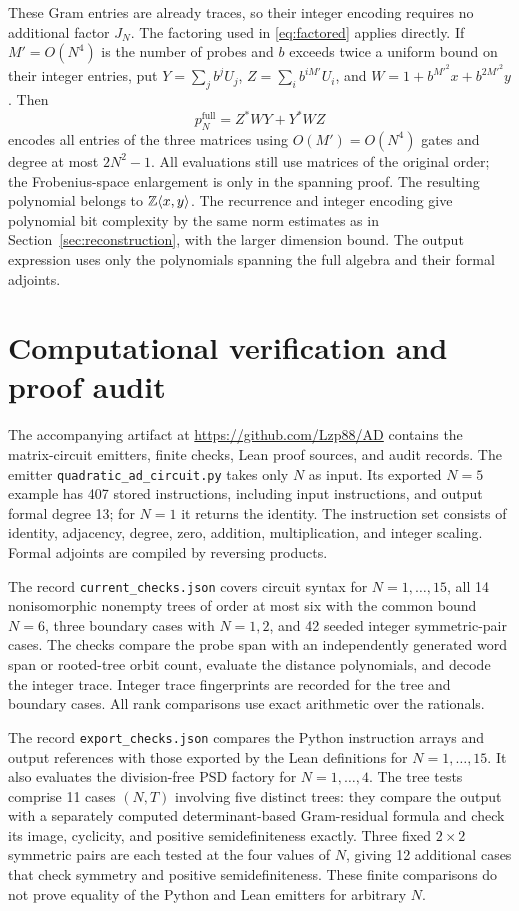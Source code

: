 \documentclass[11pt,letterpaper]{article}
\theoremstyle{definition}\newtheorem{definition}[theorem]{Definition}
\theoremstyle{remark}\newtheorem{remark}[theorem]{Remark}
\begin{document}
These Gram entries are already traces, so their integer encoding requires
no additional factor $J_N$. The factoring used in \eqref{eq:factored}
applies directly. If $M'=O(N^4)$ is the number of probes and $b$ exceeds twice a uniform bound on their integer entries, put $Y=\sum_jb^jU_j$, $Z=\sum_ib^{iM'}U_i$, and $W=1+b^{M'^2}x+b^{2M'^2}y$. Then
\[
p_N^{\mathrm{full}}=Z^*WY+Y^*WZ
\]
encodes all entries of the three matrices using $O(M')=O(N^4)$ gates and degree at most $2N^2-1$. All evaluations still use matrices of the original order; the Frobenius-space enlargement is only in the spanning proof. The resulting polynomial belongs to $\mathbb Z\langle x,y\rangle$. The recurrence and integer encoding give polynomial bit complexity by the same norm estimates as in Section~\ref{sec:reconstruction}, with the larger dimension bound. The output expression uses only the polynomials spanning the full algebra and their formal adjoints.

\section{Computational verification and proof audit}\label{sec:verification}
The accompanying artifact at \url{https://github.com/Lzp88/AD} contains the matrix-circuit emitters, finite checks, Lean proof sources, and audit records. The emitter \texttt{quadratic\_ad\_circuit.py} takes only $N$ as input. Its exported $N=5$ example has 407 stored instructions, including input instructions, and output formal degree 13; for $N=1$ it returns the identity. The instruction set consists of identity, adjacency, degree, zero, addition, multiplication, and integer scaling. Formal adjoints are compiled by reversing products.

The record \texttt{current\_checks.json} covers circuit syntax for $N=1,\ldots,15$, all 14 nonisomorphic nonempty trees of order at most six with the common bound $N=6$, three boundary cases with $N=1,2$, and 42 seeded integer symmetric-pair cases. The checks compare the probe span with an independently generated word span or rooted-tree orbit count, evaluate the distance polynomials, and decode the integer trace. Integer trace fingerprints are recorded for the tree and boundary cases. All rank comparisons use exact arithmetic over the rationals.

The record \texttt{export\_checks.json} compares the Python instruction arrays and output references with those exported by the Lean definitions for $N=1,\ldots,15$. It also evaluates the division-free PSD factory for $N=1,\ldots,4$. The tree tests comprise 11 cases $(N,T)$ involving five distinct trees: they compare the output with a separately computed determinant-based Gram-residual formula and check its image, cyclicity, and positive semidefiniteness exactly. Three fixed $2\times2$ symmetric pairs are each tested at the four values of $N$, giving 12 additional cases that check symmetry and positive semidefiniteness. These finite comparisons do not prove equality of the Python and Lean emitters for arbitrary $N$.
\end{document}
